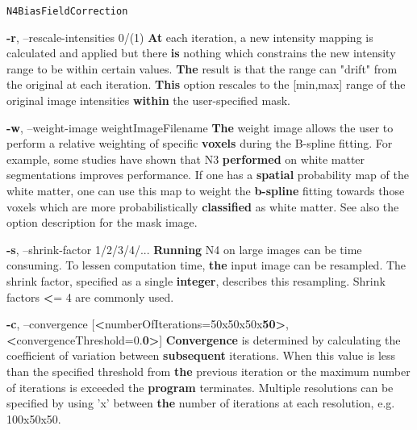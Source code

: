 \documentclass[ignorenonframetext,]{beamer}
\newenvironment{Shaded}{\begin{snugshade}}{\end{snugshade}}
\newcommand{\KeywordTok}[1]{\textcolor[rgb]{0.13,0.29,0.53}{\textbf{{#1}}}}
\newcommand{\StringTok}[1]{\textcolor[rgb]{0.31,0.60,0.02}{{#1}}}
\newcommand{\NormalTok}[1]{{#1}}
\begin{document}
\begin{frame}[fragile]{\texttt{N4BiasFieldCorrection}}
\begin{Shaded}
\begin{Highlighting}[]
     \KeywordTok{-r}\NormalTok{, --rescale-intensities 0/(1)}
          \KeywordTok{At} \NormalTok{each iteration, a new intensity mapping is calculated and applied but there}
          \KeywordTok{is} \NormalTok{nothing which constrains the new intensity range to be within certain values.}
          \KeywordTok{The} \NormalTok{result is that the range can }\StringTok{"drift"} \NormalTok{from the original at each iteration.}
          \KeywordTok{This} \NormalTok{option rescales to the [min,max] range of the original image intensities}
          \KeywordTok{within} \NormalTok{the user-specified mask.}

     \KeywordTok{-w}\NormalTok{, --weight-image weightImageFilename}
          \KeywordTok{The} \NormalTok{weight image allows the user to perform a relative weighting of specific}
          \KeywordTok{voxels} \NormalTok{during the B-spline fitting. For example, some studies have shown that N3}
          \KeywordTok{performed} \NormalTok{on white matter segmentations improves performance. If one has a}
          \KeywordTok{spatial} \NormalTok{probability map of the white matter, one can use this map to weight the}
          \KeywordTok{b-spline} \NormalTok{fitting towards those voxels which are more probabilistically}
          \KeywordTok{classified} \NormalTok{as white matter. See also the option description for the mask image.}

     \KeywordTok{-s}\NormalTok{, --shrink-factor 1/2/3/4/...}
          \KeywordTok{Running} \NormalTok{N4 on large images can be time consuming. To lessen computation time,}
          \KeywordTok{the} \NormalTok{input image can be resampled. The shrink factor, specified as a single}
          \KeywordTok{integer}\NormalTok{, describes this resampling. Shrink factors }\KeywordTok{<}\NormalTok{= 4 are commonly used.}

     \KeywordTok{-c}\NormalTok{, --convergence [}\KeywordTok{<}\NormalTok{numberOfIterations=50x50x50x}\KeywordTok{50>}\NormalTok{,}\KeywordTok{<}\NormalTok{convergenceThreshold=0.}\KeywordTok{0>}\NormalTok{]}
          \KeywordTok{Convergence} \NormalTok{is determined by calculating the coefficient of variation between}
          \KeywordTok{subsequent} \NormalTok{iterations. When this value is less than the specified threshold from}
          \KeywordTok{the} \NormalTok{previous iteration or the maximum number of iterations is exceeded the}
          \KeywordTok{program} \NormalTok{terminates. Multiple resolutions can be specified by using }\StringTok{'x'} \NormalTok{between}
          \KeywordTok{the} \NormalTok{number of iterations at each resolution, e.g. 100x50x50.}


\end{Highlighting}
\end{Shaded}
\end{frame}
\end{document}
